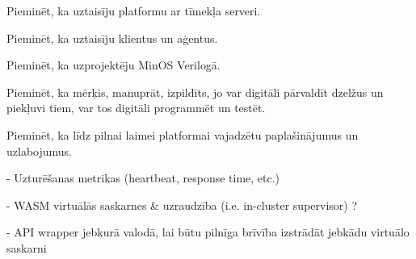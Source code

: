 Pieminēt, ka uztaisīju platformu ar tīmekļa serveri.

Pieminēt, ka uztaisīju klientus un aģentus.

Pieminēt, ka uzprojektēju MinOS Verilogā.

Pieminēt, ka mērķis, manuprāt, izpildīts, jo var digitāli pārvaldīt dzelžus un piekļuvi tiem, var tos digitāli programmēt un testēt.   

Pieminēt, ka līdz pilnai laimei platformai vajadzētu paplašinājumus un uzlabojumus.

- Uzturēšanas metrikas (heartbeat, response time, etc.)

- WASM virtuālās saskarnes & uzraudzība (i.e. in-cluster supervisor) ?

- API wrapper jebkurā valodā, lai būtu pilnīga brīvība izstrādāt jebkādu virtuālo saskarni
